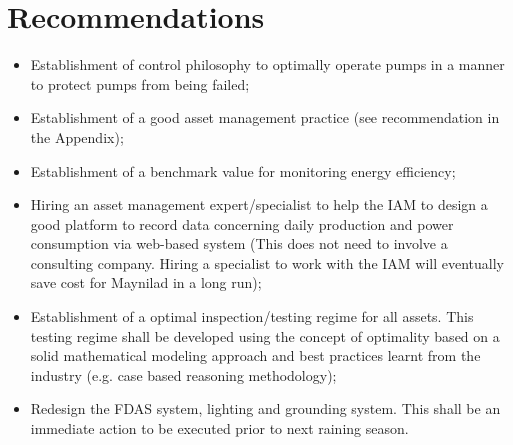 \section{Recommendations}
\begin{itemize}
\item Establishment of control philosophy to optimally operate pumps in a manner to protect pumps from being failed;
\item Establishment of a good asset management practice (see recommendation in the Appendix);
\item Establishment of a benchmark value for monitoring energy efficiency;
\item Hiring an asset management expert/specialist to help the IAM to design a good platform to record data concerning daily production and power consumption via web-based system (This does not need to involve a consulting company. Hiring a specialist to work with the IAM will eventually save cost for Maynilad in a long run);
\item Establishment of a optimal inspection/testing regime for all assets. This testing regime shall be developed using the concept of optimality based on a solid mathematical modeling approach and best practices learnt from the industry (e.g. case based reasoning methodology);
\item Redesign the FDAS system, lighting and grounding system. This shall be an immediate action to be executed prior to next raining season.

\end{itemize}



